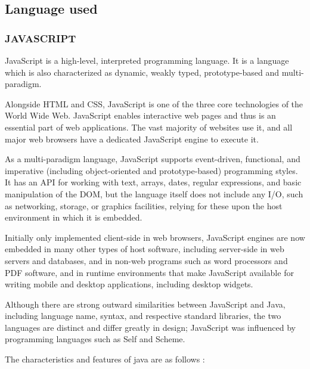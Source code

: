 \subsection{Language used}
\subsubsection{JAVASCRIPT}

JavaScript is a high-level, interpreted programming language. It is a language which is also characterized as dynamic, weakly typed, prototype-based and multi-paradigm.

Alongside HTML and CSS, JavaScript is one of the three core technologies of the World Wide Web. JavaScript enables interactive web pages and thus is an essential part of web applications. The vast majority of websites use it, and all major web browsers have a dedicated JavaScript engine to execute it.

As a multi-paradigm language, JavaScript supports event-driven, functional, and imperative (including object-oriented and prototype-based) programming styles. It has an API for working with text, arrays, dates, regular expressions, and basic manipulation of the DOM, but the language itself does not include any I/O, such as networking, storage, or graphics facilities, relying for these upon the host environment in which it is embedded.

Initially only implemented client-side in web browsers, JavaScript engines are now embedded in many other types of host software, including server-side in web servers and databases, and in non-web programs such as word processors and PDF software, and in runtime environments that make JavaScript available for writing mobile and desktop applications, including desktop widgets.

Although there are strong outward similarities between JavaScript and Java, including language name, syntax, and respective standard libraries, the two languages are distinct and differ greatly in design; JavaScript was influenced by programming languages such as Self and Scheme.

The characteristics and features of java are as follows :

